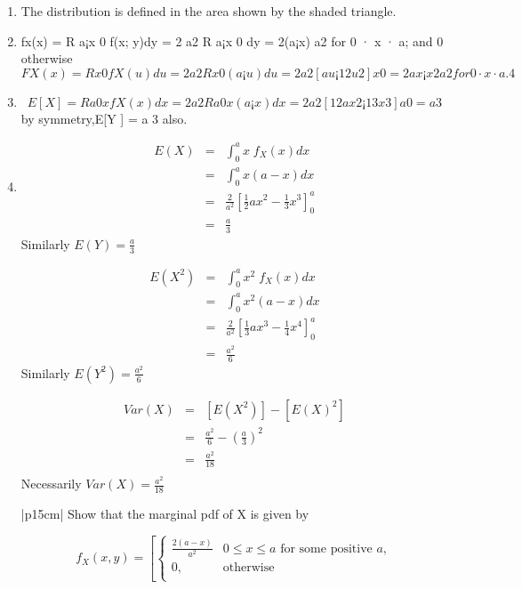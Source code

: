 \documentclass[a4paper,12pt]{article}
\begin{document}
\begin{enumerate}
\item The distribution is defined in the area shown by the shaded triangle.

\item  fx(x) =
R a¡x
0 f(x; y)dy = 2
a2
R a¡x
0 dy = 2(a¡x)
a2 for 0 · x · a; and 0 otherwise
\[FX(x) =
R x
0 fX(u)du = 2
a2
R x
0 (a ¡ u)du = 2
a2 [au ¡ 1
2u2]x
0 = 2ax¡x2
a2 for 0 · x · a.
4\]
\item \[E[X] =
R a
0 xfX(x)dx = 2
a2
R a
0 x(a ¡ x)dx = 2
a2 [ 1
2ax2 ¡ 1
3x3]a
0 = a
3 \]by symmetry,E[Y ] = a
3
also.
\item 

\begin{eqnarray*}
E(X) &=& \int^{a}_{0} x \;f_X(x) dx \\
    &=&\int^{a}_{0} x(a-x) dx \\
    &=&  \frac{2}{a^2}\left[ \frac{1}{2}ax^2 - \frac{1}{3}x^3  \right]^{a}_{0}\\
    &=& \frac{a}{3}  
\end{eqnarray*}
Similarly $E(Y) = \frac{a}{3} $

\begin{eqnarray*}
E(X^2) &=& \int^{a}_{0} x^2 \;f_X(x) dx \\
    &=&\int^{a}_{0} x^2(a-x) dx \\
    &=&  \frac{2}{a^2}\left[ \frac{1}{3}ax^3 - \frac{1}{4}x^4  \right]^{a}_{0}\\
    &=& \frac{a^2}{6}  
\end{eqnarray*}
Similarly $E(Y^2) = \frac{a^2}{6} $

\begin{eqnarray*}
Var(X) &=& [E(X^2)] - [E(X)^2] \\
      &=& \frac{a^2}{6} - \left(\frac{a}{3}\right)^2 \\
     &=& \frac{a^2}{18} \\
\end{eqnarray*}
Necessarily $Var(X) = \frac{a^2}{18}$


\newpage
  \begin{table}[ht!]
     \centering
     \begin{tabular}{|p{15cm}|}
     \hline
  Show that the marginal pdf of X is given by 



\[  f_X(x,y) = \left[ \begin{cases}  
\frac{2(a-x)}{a^2} &  0 \leq x  \leq a \mbox{ for some positive } a,    \\
0,  & \mbox{otherwise} \\ 
\end{cases}\]
  

\end{tabular}
\end{table}
\end{enumerate}
\end{document}
